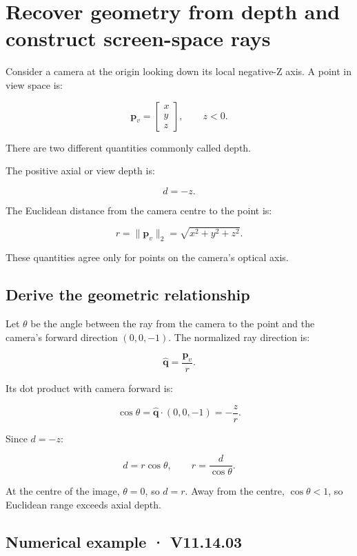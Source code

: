 \section{Recover geometry from depth and construct screen-space rays}\label{02-foundations-ii-ch035-recover-geometry-from-depth-and-construct-screen-space-rays}

Consider a camera at the origin looking down its local negative-Z axis. A point in view space is:

\[ \mathbf p_v= \begin{bmatrix} x\\y\\z \end{bmatrix}, \qquad z<0. \]

There are two different quantities commonly called depth.

The positive axial or view depth is:

\[ \boxed{d=-z}. \]

The Euclidean distance from the camera centre to the point is:

\[ \boxed{ r=\|\mathbf p_v\|_2=\sqrt{x^2+y^2+z^2}. } \]

These quantities agree only for points on the camera's optical axis.

\subsection{Derive the geometric relationship}\label{02-foundations-ii-ch035-derive-the-geometric-relationship}

Let \(\theta\) be the angle between the ray from the camera to the point and the camera's forward direction \((0,0,-1)\). The normalized ray direction is:

\[ \hat{\mathbf q}=\frac{\mathbf p_v}{r}. \]

Its dot product with camera forward is:

\[ \cos\theta = \hat{\mathbf q}\cdot(0,0,-1) = -\frac zr. \]

Since \(d=-z\):

\[ \boxed{d=r\cos\theta}, \qquad \boxed{r=\frac d{\cos\theta}}. \]

At the centre of the image, \(\theta=0\), so \(d=r\). Away from the centre, \(\cos\theta<1\), so Euclidean range exceeds axial depth.

\subsection{Numerical example · V11.14.03}\label{02-foundations-ii-ch035-numerical-example-v11.14.03}

